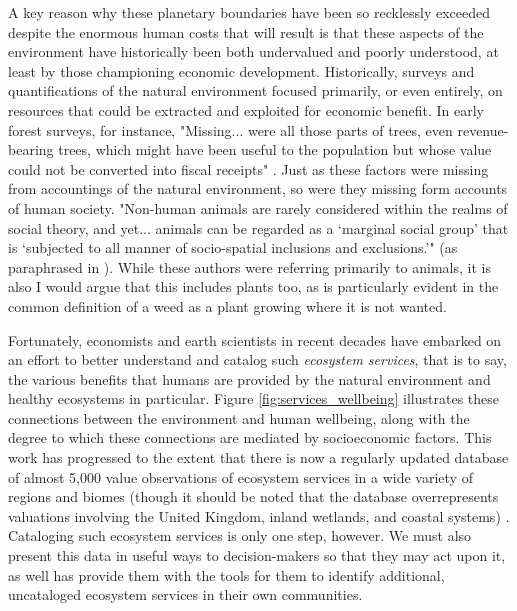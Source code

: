 A key reason why these planetary boundaries have been so recklessly exceeded despite the enormous human costs that will result is that these aspects of the environment have historically been both undervalued and poorly understood, at least by those championing economic development. Historically, surveys and quantifications of the natural environment focused primarily, or even entirely, on resources that could be extracted and exploited for economic benefit. In early forest surveys, for instance, "Missing... were all those parts of trees, even revenue-bearing trees, which might have been useful to the population but whose value could not be converted into fiscal receipts" \cite{scottSeeingStateHow2020}. Just as these factors were missing from accountings of the natural environment, so were they missing form accounts of human society. "Non-human animals are rarely considered within the realms of social theory, and yet... animals can be regarded as a `marginal social group' that is `subjected to all manner of socio-spatial inclusions and exclusions.'" (\cite{philolAnimalsGeographyCity1995,westcoatBringingAnimalsBack1995,wolchAnimalGeographiesPlace1998}as paraphrased in \cite{harrisRethinkingMapsMorethanhuman2011}). While these authors were referring primarily to animals, it is also  I would argue that this includes plants too, as is particularly evident in the common definition of a weed as a plant growing where it is not wanted.

Fortunately, economists and earth scientists in recent decades have embarked on an effort to better understand and catalog such \textit{ecosystem services}, that is to say, the various benefits that humans are provided by the natural environment and healthy ecosystems in particular. Figure \ref{fig:services_wellbeing} illustrates these connections between the environment and human wellbeing, along with the degree to which these connections are mediated by socioeconomic factors. This work has progressed to the extent that there is now a regularly updated database of almost 5,000 value observations of ecosystem services in a wide variety of regions and biomes (though it should be noted that the database overrepresents valuations involving the United Kingdom, inland wetlands, and coastal systems) \cite{grootEcosystemServicesValuation2020}. Cataloging such ecosystem services is only one step, however. We must also present this data in useful ways to decision-makers  so that they may act upon it, as well has provide them with the tools for them to identify additional, uncataloged ecosystem services in their own communities.

